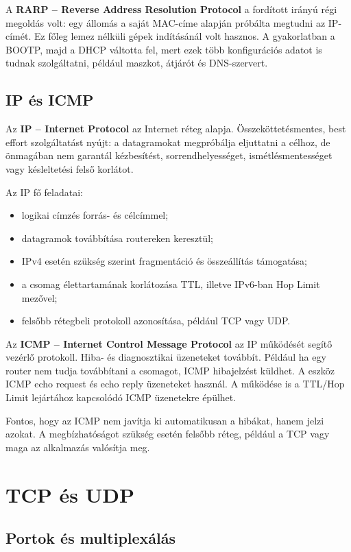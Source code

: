 A \textbf{RARP -- Reverse Address Resolution Protocol} a fordított irányú régi megoldás volt: egy állomás a saját MAC-címe alapján próbálta megtudni az IP-címét. Ez főleg lemez nélküli gépek indításánál volt hasznos. A gyakorlatban a BOOTP, majd a DHCP váltotta fel, mert ezek több konfigurációs adatot is tudnak szolgáltatni, például maszkot, átjárót és DNS-szervert.

\subsection{IP és ICMP}

Az \textbf{IP -- Internet Protocol} az Internet réteg alapja. Összeköttetésmentes, best effort szolgáltatást nyújt: a datagramokat megpróbálja eljuttatni a célhoz, de önmagában nem garantál kézbesítést, sorrendhelyességet, ismétlésmentességet vagy késleltetési felső korlátot.

Az IP fő feladatai:

\begin{itemize}
  \item logikai címzés forrás- és célcímmel;
  \item datagramok továbbítása routereken keresztül;
  \item IPv4 esetén szükség szerint fragmentáció és összeállítás támogatása;
  \item a csomag élettartamának korlátozása TTL, illetve IPv6-ban Hop Limit mezővel;
  \item felsőbb rétegbeli protokoll azonosítása, például TCP vagy UDP.
\end{itemize}

Az \textbf{ICMP -- Internet Control Message Protocol} az IP működését segítő vezérlő protokoll. Hiba- és diagnosztikai üzeneteket továbbít. Például ha egy router nem tudja továbbítani a csomagot, ICMP hibajelzést küldhet. A  eszköz ICMP echo request és echo reply üzeneteket használ. A  működése is a TTL/Hop Limit lejártához kapcsolódó ICMP üzenetekre épülhet.

Fontos, hogy az ICMP nem javítja ki automatikusan a hibákat, hanem jelzi azokat. A megbízhatóságot szükség esetén felsőbb réteg, például a TCP vagy maga az alkalmazás valósítja meg.

\section{TCP és UDP}

\subsection{Portok és multiplexálás}

